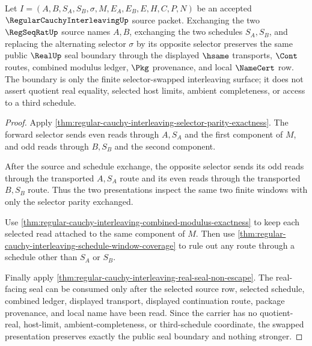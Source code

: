 \begin{theorem}
\label{thm:regular-cauchy-interleaving-swap-symmetry-boundary}
Let $I=(A,B,S_A,S_B,\sigma,M,E_A,E_B,E,H,C,P,N)$ be an accepted $\RegularCauchyInterleavingUp$ source packet. Exchanging the two $\RegSeqRatUp$ source names $A,B$, exchanging the two schedules $S_A,S_B$, and replacing the alternating selector $\sigma$ by its opposite selector preserves the same public $\RealUp$ seal boundary through the displayed $\hsame$ transports, $\Cont$ routes, combined modulus ledger, $\Pkg$ provenance, and local $\NameCert$ row. The boundary is only the finite selector-swapped interleaving surface; it does not assert quotient real equality, selected host limits, ambient completeness, or access to a third schedule.
\end{theorem}
\begin{proof}
Apply \autoref{thm:regular-cauchy-interleaving-selector-parity-exactness}. The forward selector sends even reads through $A,S_A$ and the first component of $M$, and odd reads through $B,S_B$ and the second component.

After the source and schedule exchange, the opposite selector sends its odd reads through the transported $A,S_A$ route and its even reads through the transported $B,S_B$ route. Thus the two presentations inspect the same two finite windows with only the selector parity exchanged.

Use \autoref{thm:regular-cauchy-interleaving-combined-modulus-exactness} to keep each selected read attached to the same component of $M$. Then use \autoref{thm:regular-cauchy-interleaving-schedule-window-coverage} to rule out any route through a schedule other than $S_A$ or $S_B$.

Finally apply \autoref{thm:regular-cauchy-interleaving-real-seal-non-escape}. The real-facing seal can be consumed only after the selected source row, selected schedule, combined ledger, displayed transport, displayed continuation route, package provenance, and local name have been read. Since the carrier has no quotient-real, host-limit, ambient-completeness, or third-schedule coordinate, the swapped presentation preserves exactly the public seal boundary and nothing stronger.
\end{proof}

